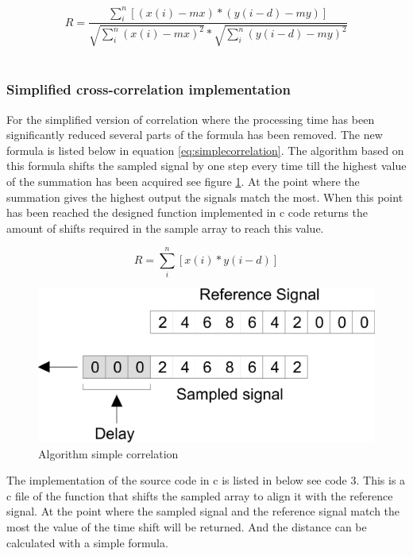 \documentclass[10pt,a4paper]{article}
\begin{document}
\begin{equation}
R = \frac{\sum\limits_{i}^n [(x(i) - mx) * (y(i-d) - my)]}{\sqrt{\sum\limits_{i}^n (x(i) - mx)^2} * \sqrt{\sum\limits_{i}^n (y(i-d) - my)^2}}
\label{eq:correlation-formula}
\end{equation}
\\



\subsubsection{Simplified cross-correlation implementation}
\label{sec:simplecross}
For the simplified version of correlation where the processing time has been significantly reduced several parts of the formula has been removed. The new formula is listed below in equation \ref{eq:simplecorrelation}. The algorithm based on this formula shifts the sampled signal by one step every time till the highest value of the summation has been acquired see figure \ref{fig:simplecorrelation}. At the point where the summation gives the highest output the signals match the most. When this point has been reached the designed function implemented in c code returns the amount of shifts required in the sample array to reach this value.

\begin{equation}
R = \sum\limits_{i}^n [x(i) * y(i-d)]
\label{eq:simplecorrelation}
\end{equation}

\begin{figure}[H]
   \centering
   \includegraphics[width=\textwidth]{simplecorrelation.pdf}
   \caption{Algorithm simple correlation}
   \label{fig:simplecorrelation}
\end{figure}

The implementation of the source code in c is listed in below see code 3. This is a c file of the function that shifts the sampled array to align it with the reference signal. At the point where the sampled signal and the reference signal match the most the value of the time shift will be returned. And the distance can be calculated with a simple formula.
\\

\end{document}
